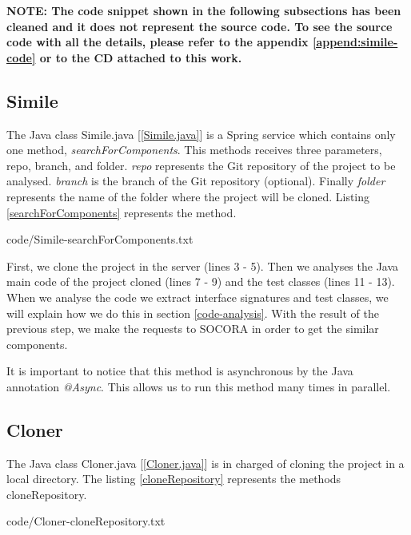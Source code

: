 \textbf{NOTE: The code snippet shown in the following subsections has been cleaned and it does not represent the source code. To see the source code with all the details, please refer to the appendix \ref{append:simile-code} or to the CD attached to this work.}

\subsection{Simile}
The Java class Simile.java [\ref{Simile.java}] is a Spring service which contains only one method, \emph{searchForComponents}. This methods receives three parameters, repo, branch, and folder. \emph{repo} represents the Git repository of the project to be analysed. \emph{branch} is the branch of the Git repository (optional). Finally \emph{folder} represents the name of the folder where the project will be cloned. Listing \ref{searchForComponents} represents the method.


{code/Simile-searchForComponents.txt}

First, we clone the project in the server (lines 3 - 5). Then we analyses the Java main code of the project cloned (lines 7 - 9) and the test classes (lines 11 - 13). When we analyse the code we extract interface signatures and test classes, we will explain how we do this in section \ref{code-analysis}. With the result of the previous step, we make the requests to SOCORA in order to get the similar components.

It is important to notice that this method is asynchronous by the Java annotation \emph{@Async}. This allows us to run this method many times in parallel.

\subsection{Cloner}
The Java class Cloner.java [\ref{Cloner.java}] is in charged of cloning the project in a local directory. The listing \ref{cloneRepository} represents the methods cloneRepository.


{code/Cloner-cloneRepository.txt}

